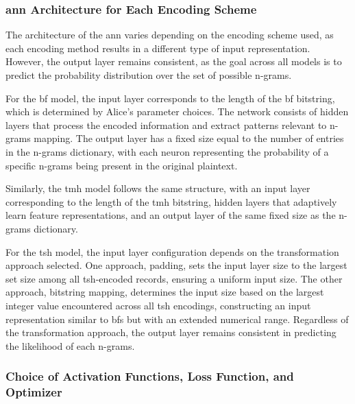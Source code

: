 \subsubsection{\ac{ann} Architecture for Each Encoding Scheme}


The architecture of the \ac{ann} varies depending on the encoding scheme used, as each encoding method results in a different type of input representation.
However, the output layer remains consistent, as the goal across all models is to predict the probability distribution over the set of possible n-grams.

For the \ac{bf} model, the input layer corresponds to the length of the \ac{bf} bitstring, which is determined by Alice’s parameter choices.
The network consists of hidden layers that process the encoded information and extract patterns relevant to n-grams mapping.
The output layer has a fixed size equal to the number of entries in the n-grams dictionary, with each neuron representing the probability of a specific n-grams being present in the original plaintext.

Similarly, the \ac{tmh} model follows the same structure, with an input layer corresponding to the length of the \ac{tmh} bitstring, hidden layers that adaptively learn feature representations, and an output layer of the same fixed size as the n-grams dictionary.

For the \ac{tsh} model, the input layer configuration depends on the transformation approach selected.
One approach, padding, sets the input layer size to the largest set size among all \ac{tsh}-encoded records, ensuring a uniform input size.
The other approach, bitstring mapping, determines the input size based on the largest integer value encountered across all \ac{tsh} encodings, constructing an input representation similar to \ac{bf}s but with an extended numerical range.
Regardless of the transformation approach, the output layer remains consistent in predicting the likelihood of each n-grams.

\subsubsection{Choice of Activation Functions, Loss Function, and Optimizer}


